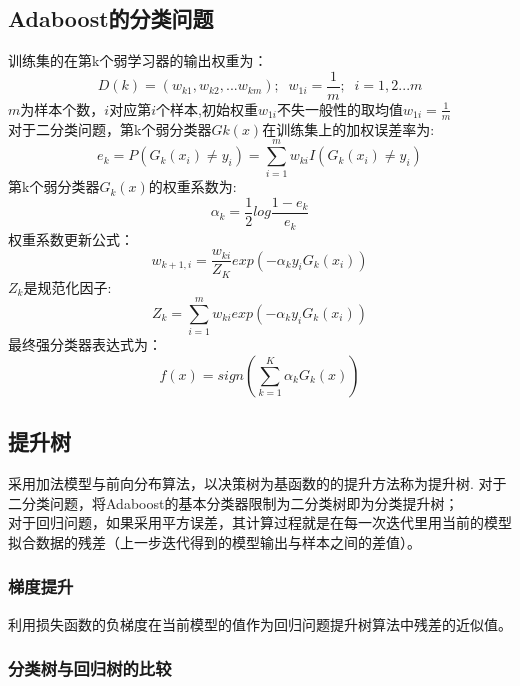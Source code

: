 \documentclass[UTF8]{article}%
\begin{document}
	\subsection{ Adaboost的分类问题}
	训练集的在第k个弱学习器的输出权重为：$$D(k) = (w_{k1}, w_{k2}, ...w_{km}) ;\;\; w_{1i}=\frac{1}{m};\;\; i =1,2...m$$ $m$为样本个数，$i$对应第$i$个样本,初始权重$ w_{1i}$不失一般性的取均值$ w_{1i}=\frac{1}{m}$\\
	对于二分类问题，第k个弱分类器$Gk(x)$在训练集上的加权误差率为:
	$$e_k = P(G_k(x_i) \neq y_i) = \sum\limits_{i=1}^{m}w_{ki}I(G_k(x_i) \neq y_i)$$
	第k个弱分类器$G_k(x)$的权重系数为:$$\alpha_k = \frac{1}{2}log\frac{1-e_k}{e_k}$$
	权重系数更新公式：$$w_{k+1,i} = \frac{w_{ki}}{Z_K}exp(-\alpha_ky_iG_k(x_i))$$
	$Z_k$是规范化因子:$$Z_k = \sum\limits_{i=1}^{m}w_{ki}exp(-\alpha_ky_iG_k(x_i))$$
	最终强分类器表达式为：$$f(x) = sign(\sum\limits_{k=1}^{K}\alpha_kG_k(x))$$
	
	\subsection{提升树}
	采用加法模型与前向分布算法，以决策树为基函数的的提升方法称为提升树.
	对于二分类问题，将Adaboost的基本分类器限制为二分类树即为分类提升树；\\
	对于回归问题，如果采用平方误差，其计算过程就是在每一次迭代里用当前的模型拟合数据的残差（上一步迭代得到的模型输出与样本之间的差值）。
	\subsubsection{梯度提升}
	利用损失函数的负梯度在当前模型的值作为回归问题提升树算法中残差的近似值。
	\subsubsection{分类树与回归树的比较}
	
\end{document}
